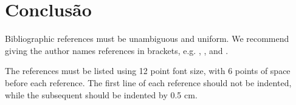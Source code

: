 \documentclass[12pt]{article}
\begin{document}
\section{Conclusão}

Bibliographic references must be unambiguous and uniform.  We recommend giving
the author names references in brackets, e.g. \cite{knuth:84},
\cite{boulic:91}, and \cite{smith:99}.

The references must be listed using 12 point font size, with 6 points of space
before each reference. The first line of each reference should not be
indented, while the subsequent should be indented by 0.5 cm.



\end{document}
